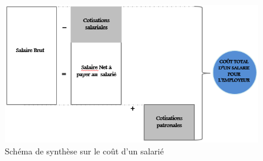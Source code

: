   
  
  
  
  
\begin{figure}[h]
	\begin{center}
		\includegraphics[scale=0.85]{images/remuneration.png}
		\caption{Schéma de synthèse sur le coût d'un salarié}
		\label{synthese-cout-salarie}
	\end{center}
\end{figure}

 











